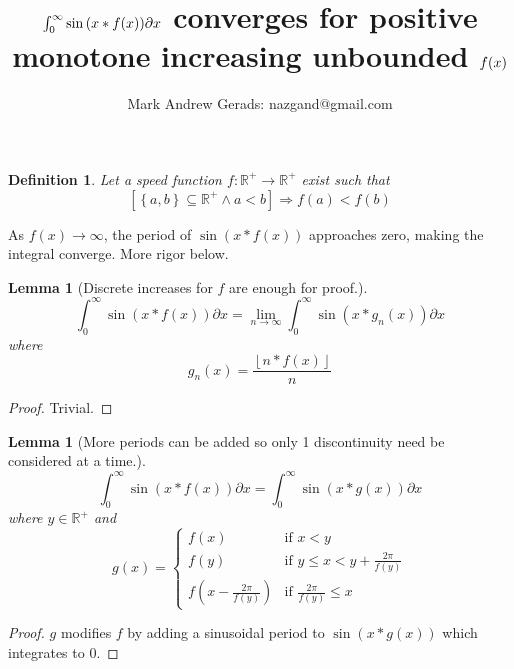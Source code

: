 \documentclass[]{article}
\author{Mark Andrew Gerads: nazgand@gmail.com}
\title{\(\int_{0}^{\infty}\sin\pqty{x*f\pqty{x}}\partial x\) converges for positive monotone increasing unbounded \(f\pqty{x}\)}
\newcommand{\pqty}[1]{{\left(#1\right)}}
\newcommand{\Bqty}[1]{{\left\{#1\right\}}}
\newcommand{\bqty}[1]{{\left[#1\right]}}
\newcommand{\floor}[1]{{\left\lfloor#1\right\rfloor}}
\newtheorem{lemma}[theorem]{Lemma}
\newtheorem{definition}[theorem]{Definition}
\numberwithin{equation}{section}
\begin{document}
	
	\maketitle
	
	\begin{definition}
		Let a speed function \(f:\mathbb{R}^+\to\mathbb{R}^+\) exist such that
		\begin{equation}
		\bqty{\Bqty{a,b}\subseteq\mathbb{R}^+\land a<b}
		\Rightarrow
		f\pqty{a}<f\pqty{b}
		\end{equation}
	\end{definition}

	As \(f\pqty{x}\to\infty\), the period of \(\sin\pqty{x*f\pqty{x}}\) approaches zero, making the integral converge. More rigor below.
	
	\begin{lemma}[Discrete increases for \(f\) are enough for proof.]
		\begin{equation}
		\int_{0}^{\infty}\sin\pqty{x*f\pqty{x}}\partial x
		=
		\lim\limits_{n\to\infty}\int_{0}^{\infty}\sin\pqty{x*g_n\pqty{x}}\partial x
		\end{equation}
		where
		\begin{equation}
			g_n\pqty{x}=\frac{\floor{n*f\pqty{x}}}{n}
		\end{equation}
	\end{lemma}
	\begin{proof}
		Trivial.
	\end{proof}

	\begin{lemma}[More periods can be added so only 1 discontinuity need be considered at a time.]
		\begin{equation}
			\int_{0}^{\infty}\sin\pqty{x*f\pqty{x}}\partial x
			=
			\int_{0}^{\infty}\sin\pqty{x*g\pqty{x}}\partial x
		\end{equation}
		where \(y\in\mathbb{R}^+\) and
		\begin{equation}
			g\pqty{x}=
			\begin{cases}
				f\pqty{x} & \text{if } x<y\\
				f\pqty{y} & \text{if } y\leq x<y+\frac{2\pi}{f\pqty{y}}\\
				f\pqty{x-\frac{2\pi}{f\pqty{y}}} & \text{if } \frac{2\pi}{f\pqty{y}}\leq x
			\end{cases}
		\end{equation}
	\end{lemma}
	\begin{proof}
		\(g\) modifies \(f\) by adding a sinusoidal period to \(\sin\pqty{x*g\pqty{x}}\) which integrates to \(0\).
	\end{proof}
\end{document}
